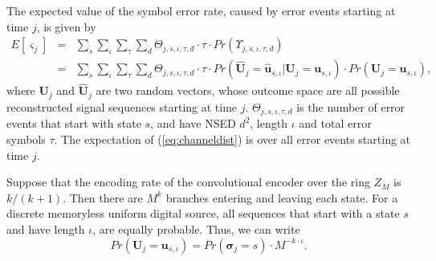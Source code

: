 \documentclass[12pt,twoside,onecolumn,a4paper,english]{IEEEtran2e}
\begin{document}
The expected value of the symbol error rate, caused by error events
starting at time $j$, is given by
\begin{eqnarray}\label{eq:channeldist}%
E[\varsigma_j]&=&
\sum_s\sum_\iota\sum_\tau\sum_d{\Theta_{j,s,\iota,\tau,d}}{\cdot}{\tau}{\cdot}Pr(\Upsilon_{j,s,\iota,\tau,d})\nonumber\\
&=&
\sum_s\sum_\iota\sum_\tau\sum_d{\Theta_{j,s,\iota,\tau,d}}{\cdot}{\tau}{\cdot}%
Pr({\hat{\mathbf{\boldsymbol{U}}}}_j={\hat{\mathbf{\boldsymbol{u}}}}_{s,\iota}|{\mathbf{\boldsymbol{U}}}_j={\mathbf{\boldsymbol{u}}}_{s,\iota}){\cdot}Pr({\mathbf{\boldsymbol{U}}}_j={\mathbf{\boldsymbol{u}}}_{s,\iota}),
\end{eqnarray}
where ${\mathbf{\boldsymbol{U}}}_j$ and
${\hat{\mathbf{\boldsymbol{U}}}}_j$ are two random vectors, whose
outcome space are all possible
reconstructed signal sequences starting at time $j$.
$\Theta_{j,s,\iota,\tau,d}$ is the number of error events that start with
state $s$, and have NSED $d^2$, length $\iota$ and total error symbols
$\tau$. The expectation of (\ref{eq:channeldist}) is over all error
events starting at time $j$.

Suppose that the encoding rate of the convolutional encoder over
the ring $Z_M$ is $k/(k+1)$. Then there are $M^k$ branches
entering and leaving each state. For a discrete memoryless uniform
digital source, all sequences that start with a state $s$ and have
length $\iota$, are
equally probable. Thus, we can write %
\begin{equation}\label{eq:expectednofoevent}%
Pr({\mathbf{\boldsymbol{U}}}_j={\mathbf{\boldsymbol{u}}}_{s,\iota})=Pr({\mathbf{\boldsymbol{\sigma}}}_j=s){\cdot}M^{-k{\cdot}\iota}.
\end{equation}
\end{document}
